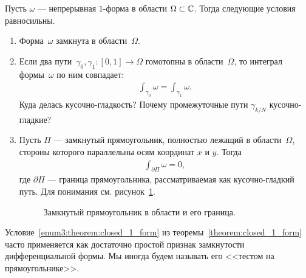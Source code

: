 \documentclass[../complex-analysis.tex]{subfiles}
\begin{document}
\begin{thm}
 \label{theorem:closed_1_form}
 Пусть $\omega$ --- непрерывная $1$-форма в области $\Omega \subset \mathbb{C}$. Тогда следующие условия равносильны.
 \begin{enumerate}
  \item \label{enum1:theorem:closed_1_form} Форма~$\omega$ замкнута в области~$\Omega$.
  \item \label{enum2:theorem:closed_1_form} Если два пути~$\gamma_0, \gamma_1 \colon [0,1] \to \Omega$ гомотопны в области~$\Omega$, то интеграл формы~$ \omega $ по ним совпадает:
   \begin{align*}
    \int_{\gamma_0} \omega = \int_{\gamma_1} \omega.
   \end{align*} {\color{red} Куда делась кусочно-гладкость? Почему промежуточные пути $ \gamma_{k / N} $ кусочно-гладкие?}
  \item \label{enum3:theorem:closed_1_form} Пусть $\Pi$ --- замкнутый прямоугольник, полностью лежащий в области~$\Omega$, стороны которого параллельны осям координат $ x $ и $ y $. Тогда
   \begin{align*}
    \int_{\partial \Pi} \omega = 0,
   \end{align*} где $ \partial\Pi $ --- граница прямоугольника, рассматриваемая как кусочно-гладкий путь. Для понимания см. рисунок~\ref{fig:closed-rectangle-and-its-border}.
   \begin{figure}[ht]
    \centering
    \caption{Замкнутый прямоугольник в области и его граница.}
    \label{fig:closed-rectangle-and-its-border}
   \end{figure}
 \end{enumerate}
\end{thm}
\begin{remrk*}
 Условие~\ref{enum3:theorem:closed_1_form} из теоремы~\ref{theorem:closed_1_form} часто применяется как достаточно простой признак замкнутости дифференциальной формы. Мы иногда будем называть его <<тестом на прямоугольнике>>.
\end{remrk*}
\end{document}
